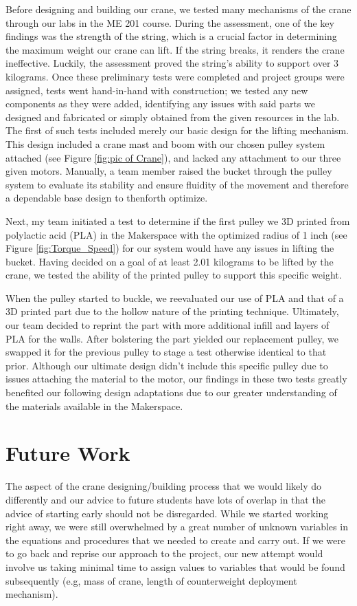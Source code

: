 \documentclass[letterpaper, 12pt]{article}
\begin{document}
Before designing and building our crane, we tested many mechanisms of the crane through our labs in the ME 201 course. 
During the assessment, one of the key findings was the strength of the string, which is a crucial factor in determining the maximum weight our crane can lift. 
If the string breaks, it renders the crane ineffective.
Luckily, the assessment proved the string’s ability to support over 3 kilograms.
Once these preliminary tests were completed and project groups were assigned, tests went hand-in-hand with construction; we tested any new components as they were added, identifying any issues with said parts we designed and fabricated or simply obtained from the given resources in the lab. 
The first of such tests included merely our basic design for the lifting mechanism. 
This design included a crane mast and boom with our chosen pulley system attached (see Figure \ref{fig:pic of Crane}), and lacked any attachment to our three given motors. 
Manually, a team member raised the bucket through the pulley system to evaluate its stability and ensure fluidity of the movement and therefore a dependable base design to thenforth optimize. 

Next, my team initiated a test to determine if the first pulley we 3D printed from polylactic acid (PLA) in the Makerspace with the optimized radius of 1 inch (see Figure \ref{fig:Torque_Speed}) for our system would have any issues in lifting the bucket. 
Having decided on a goal of at least 2.01 kilograms to be lifted by the crane, we tested the ability of the printed pulley to support this specific weight. 

When the pulley started to buckle, we reevaluated our use of PLA and that of a 3D printed part due to the hollow nature of the printing technique. 
Ultimately, our team decided to reprint the part with more additional infill and layers of PLA for the walls. 
After bolstering the part yielded our replacement pulley, we swapped it for the previous pulley to stage a test otherwise identical to that prior. 
Although our ultimate design didn’t include this specific pulley due to issues attaching the material to the motor, our findings in these two tests greatly benefited our following design adaptations due to our greater understanding of the materials available in the Makerspace.


\section{Future Work}
The aspect of the crane designing/building process that we would likely do differently and our advice to future students have lots of overlap in that the advice of starting early should not be disregarded. 
While we started working right away, we were still overwhelmed by a great number of unknown variables in the equations and procedures that we needed to create and carry out. 
If we were to go back and reprise our approach to the project, our new attempt would involve us taking minimal time to assign values to variables that would be found subsequently (e.g, mass of crane, length of counterweight deployment mechanism).
\end{document}
